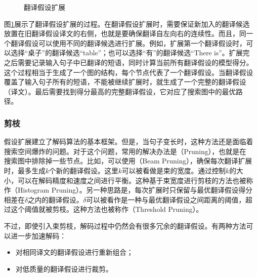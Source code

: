 \begin{figure}[htp]
\centering

\caption{翻译假设扩展}
\label{fig:4-28}
\end{figure}

\parinterval 图\ref{fig:4-28}展示了翻译假设扩展的过程。在翻译假设扩展时，需要保证新加入的翻译候选放置在旧翻译假设译文的右侧，也就是要确保翻译自左向右的连续性。而且，同一个翻译假设可以使用不同的翻译候选进行扩展。例如，扩展第一个翻译假设时，可以选择``桌子''的翻译候选``table''；也可以选择``有''的翻译候选``There is''。扩展完之后需要记录输入句子中已翻译的短语，同时计算当前所有翻译假设的模型得分。这个过程相当于生成了一个图的结构，每个节点代表了一个翻译假设。当翻译假设覆盖了输入句子所有的短语，不能被继续扩展时，就生成了一个完整的翻译假设（译文）。最后需要找到得分最高的完整翻译假设，它对应了搜索图中的最优路径。


\subsubsection{剪枝}

\parinterval 假设扩展建立了解码算法的基本框架。但是，当句子变长时，这种方法还是面临着搜索空间爆炸的问题。对于这个问题，常用的解决办法是{\small{}}（Pruning），也就是在搜索图中排除掉一些节点。比如，可以使用{\small{}}（Beam Pruning），确保每次翻译扩展时，最多生成$k$个新的翻译假设。这里$k$可以被看做是束的宽度。通过控制$k$的大小，可以在解码精度和速度之间进行平衡。这种基于束宽度进行剪枝的方法也被称作{\small{}}（Histogram Pruning）。另一种思路是，每次扩展时只保留与最优翻译假设得分相差在$\delta$之内的翻译假设。$\delta$可以被看作是一种与最优翻译假设之间距离的阈值，超过这个阈值就被剪枝。这种方法也被称作{\small{}}（Threshold Pruning）。

\parinterval 不过，即使引入束剪枝，解码过程中仍然会有很多冗余的翻译假设。有两种方法可以进一步加速解码：

\begin{itemize}
\vspace{0.5em}
\item 对相同译文的翻译假设进行重新组合；
\vspace{0.5em}
\item 对低质量的翻译假设进行裁剪。
\vspace{0.5em}
\end{itemize}

